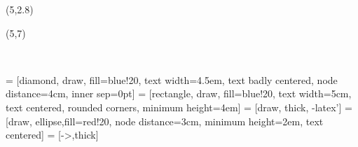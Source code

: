 
\usepackage{amsmath, bm, amssymb, amsthm, mathrsfs}
\usepackage[bb=boondox]{mathalfa}
\usepackage{paralist}
\usepackage{natbib}
\usepackage{url}
\usepackage{multirow, booktabs, float, textcmds, siunitx}
\usepackage{bm,booktabs,animate,ragged2e,multicol,microtype,hyperref}
\usepackage{tikz}

\graphicspath{{figs/}{tourism/}{energy/}}
\def\full#1{\vspace*{0.05cm}\centerline{\texttt{[image: \#1]}}}

\fontsize{13}{15}\sf
\usepackage[scale=0.85]{sourcecodepro}
\usepackage{fontawesome}

{
\begin{textblock}{10.5}(5,2.8)
{\color{white}\raggedright\par\inserttitle}
\end{textblock}
\begin{textblock}{7.5}(5,7)
{\color{white}\raggedright{\insertauthor}\mbox{}\\[0.2cm]
\insertdate}
\end{textblock}}


\usetikzlibrary{trees,shapes,arrows,matrix}
 = [diamond, draw, fill=blue!20,
    text width=4.5em, text badly centered, node distance=4cm, inner sep=0pt]
 = [rectangle, draw, fill=blue!20,
    text width=5cm, text centered, rounded corners, minimum height=4em]
 = [draw, thick, -latex']
 = [draw, ellipse,fill=red!20, node distance=3cm,
    minimum height=2em, text centered]
 = [->,thick]


\def\E{\text{E}}
\def\V{\text{Var}}
\def\bY{\bm{y}}
\def\by{\bm{y}}
\def\bS{\bm{S}}
\def\bSigma{\bm{\Sigma}}
\def\Var{\text{Var}}
\def\var{\text{Var}}
\newcommand{\btwocol}{\begin{multicols}{2}}
\newcommand{\etwocol}{\end{multicols}}

